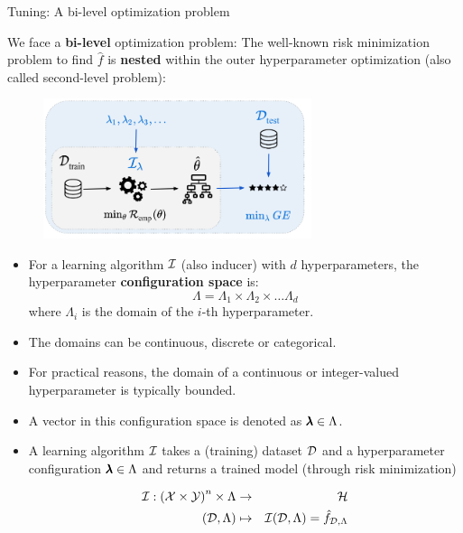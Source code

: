 \begin{frame}{Tuning: A bi-level optimization problem}

\vspace{0.2cm}

We face a \textbf{bi-level} optimization problem: The well-known risk minimization problem to find $\hat f$ is \textbf{nested} within the outer hyperparameter optimization (also called second-level problem):

\begin{center}
\begin{figure}
\includegraphics[width=0.7\textwidth]{images/riskmin_bilevel3.png}
\end{figure}
\end{center}

\framebreak

\begin{itemize}
\item For a learning algorithm $\mathcal{I}$ (also inducer) with $d$ hyperparameters, the hyperparameter \textbf{configuration space} is:
$$\Lambda=\Lambda_{1} \times \Lambda_{2} \times \ldots \Lambda_{d}$$
where $\Lambda_{i}$ is the domain of the $i$-th hyperparameter.
\item The domains can be continuous, discrete or categorical.
\item For practical reasons, the domain of a continuous or integer-valued hyperparameter is typically bounded.
\item A vector in this configuration space is denoted as $\pmb{\lambda} \in \Lambda$.
\item A learning algorithm $\mathcal{I}$ takes a (training) dataset $\mathcal{D}$ and a hyperparameter configuration $\pmb{\lambda} \in \Lambda$ and returns a trained model (through risk minimization)

\vspace*{-0.2cm}
\begin{eqnarray*}
\mathcal{I}: \left(\mathcal{X} \times \mathcal{Y}\right)^n \times \Lambda &\to& \mathcal{H} \\
(\mathcal{D}, \Lambda) &\mapsto& \mathcal{I}(\mathcal{D}, \Lambda) = \hat f_{\mathcal{D}, \Lambda}
\end{eqnarray*}
\end{itemize}


\end{frame}
